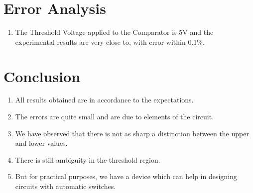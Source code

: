 \section{Error Analysis}
\begin{enumerate}
    \item The Threshold Voltage applied to the Comparator is 5V and the experimental results are very close to, with error within 0.1\%.
\end{enumerate}
\section{Conclusion}
\begin{enumerate}
    \item All results obtained are in accordance to the expectations.
    \item The errors are quite small and are due to elements of the circuit.
    \item We have observed that there is not as sharp a distinction between the upper and lower values.
    \item There is still ambiguity in the threshold region.
    \item But for practical purposes, we have a device which can help in designing circuits with automatic switches.
\end{enumerate}